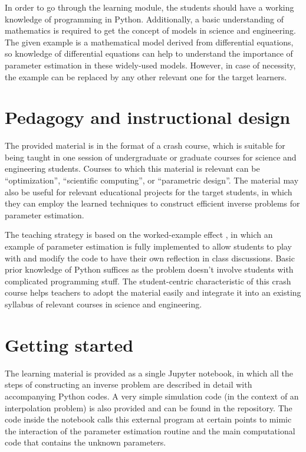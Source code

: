 In order to go through the learning module, the students should have a working knowledge of programming in Python. Additionally, a basic understanding of mathematics is required to get the concept of models in science and engineering. The given example is a mathematical model derived from differential equations, so knowledge of differential equations can help to understand the importance of parameter estimation in these widely-used models. However, in case of necessity, the example can be replaced by any other relevant one for the target learners.

\section{Pedagogy and instructional design}

The provided material is in the format of a crash course, which is suitable for being taught in one session of undergraduate or graduate courses for science and engineering students. Courses to which this material is relevant can be 
``optimization'', ``scientific computing'', or ``parametric design''. The material may also be useful for relevant educational projects for the target students, in which they can employ the learned techniques to construct efficient inverse problems for parameter estimation.

The teaching strategy is based on the worked-example effect \cite{Chen2015}, in which an example of parameter estimation is fully implemented to allow students to play with and modify the code to have their own reflection in class discussions. Basic prior knowledge of Python suffices as the problem doesn't involve students with complicated programming stuff. The student-centric characteristic of this crash course helps teachers to adopt the material easily and integrate it into an existing syllabus of relevant courses in science and engineering.

\section{Getting started}

The learning material is provided as a single Jupyter notebook, in which all the steps of constructing an inverse problem are described in detail with accompanying Python codes. A very simple simulation code (in the context of an interpolation problem) is also provided and can be found in the repository. The code inside the notebook calls this external program at certain points to mimic the interaction of the parameter estimation routine and the main computational code that contains the unknown parameters.

